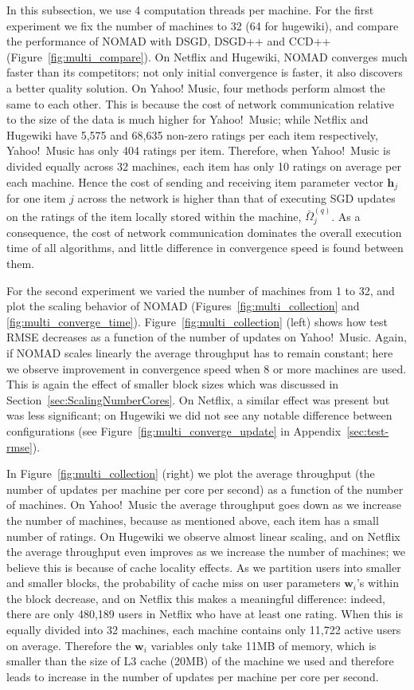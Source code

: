 \documentclass{vldb}
\newcommand{\hb}{\mathbf{h}}
\newcommand{\wb}{\mathbf{w}}
\newcommand{\Omegabar}{\bar{\Omega}}
\begin{document}
In this subsection, we use 4 computation threads per machine.  For the
first experiment we fix the number of machines to 32 (64 for hugewiki),
and compare the performance of NOMAD with DSGD, DSGD++ and CCD++
(Figure~\ref{fig:multi_compare}).  On Netflix and Hugewiki, NOMAD
converges much faster than its competitors; not only initial convergence
is faster, it also discovers a better quality solution.  On Yahoo!
Music, four methods perform almost the same to each other. This is
because the cost of network communication relative to the size of the
data is much higher for Yahoo!\ Music; while Netflix and Hugewiki have
5,575 and 68,635 non-zero ratings per each item respectively, Yahoo!\
Music has only 404 ratings per item.  Therefore, when Yahoo!~Music
is divided equally across 32 machines, each item has only 10
ratings on average per each machine.  Hence the cost of sending and
receiving item parameter vector $\hb_j$ for one item $j$ across the
network is higher than that of executing SGD updates on the ratings of
the item locally stored within the machine, $\Omegabar^{(q)}_j$.  As a
consequence, the cost of network communication dominates the overall
execution time of all algorithms, and little difference in convergence
speed is found between them.

For the second experiment we varied the number of machines from 1 to 32,
and plot the scaling behavior of NOMAD
(Figures~\ref{fig:multi_collection} and \ref{fig:multi_converge_time}).
Figure~\ref{fig:multi_collection} (left) shows how test RMSE decreases
as a function of the number of updates on Yahoo!~Music.  Again, if NOMAD
scales linearly the average throughput has to remain constant; here we
observe improvement in convergence speed when 8 or more machines are
used.  This is again the effect of smaller block sizes which was
discussed in Section~\ref{sec:ScalingNumberCores}.  On Netflix, a
similar effect was present but was less significant; on Hugewiki we did
not see any notable difference between configurations (see
Figure~\ref{fig:multi_converge_update} in
Appendix~\ref{sec:test-rmse}). 

In Figure~\ref{fig:multi_collection} (right) we plot the average
throughput (the number of updates per machine per core per second) as a
function of the number of machines.  On Yahoo!~Music the average
throughput goes down as we increase the number of machines, because as
mentioned above, each item has a small number of ratings.  On Hugewiki
we observe almost linear scaling, and on Netflix the average throughput
even improves as we increase the number of machines; we believe this is
because of cache locality effects.  As we partition users into smaller
and smaller blocks, the probability of cache miss on user parameters
$\wb_i$'s within the block decrease, and on Netflix this makes a
meaningful difference: indeed, there are only 480,189 users in Netflix
who have at least one rating.  When this is equally divided into 32
machines, each machine contains only 11,722 active users on average.
Therefore the $\wb_i$ variables only take 11MB of memory, which is
smaller than the size of L3 cache (20MB) of the machine we used and
therefore leads to increase in the number of updates per machine per
core per second.
\end{document}
